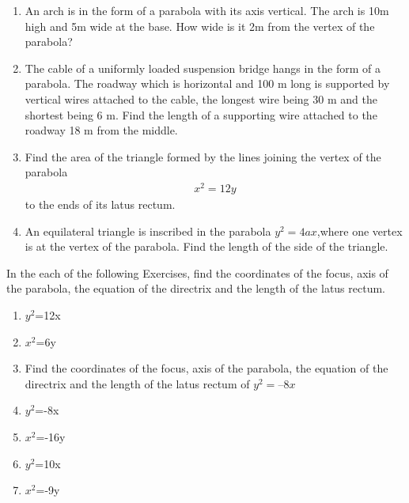 
\begin{enumerate}[label=\thesection.\arabic*,ref=\thesection.\theenumi]
\item An arch is in the form of a parabola with its axis vertical. The arch is 10m high and 5m wide at the base. How wide is it 2m from the vertex of the parabola?
\label{chapters/11/11/5/2}

\item  The cable of a uniformly loaded suspension bridge hangs in the form of a parabola. The roadway which is horizontal and 100 m long is supported by vertical wires attached to the cable, the longest wire being 30 m and the shortest being 6 m. Find the length of a supporting wire attached to the roadway 18 m from the middle.
\label{chapters/11/11/5/3}
\\
\solution

    \item Find the area of the triangle formed by the lines joining the vertex 
    of the parabola 
    \begin{align}
        x^2 = 12y
        \label{eq:chapters/11/11/5/6/parabola}
    \end{align}
    to the ends of its latus rectum.
\label{chapters/11/11/5/6}

\item An equilateral triangle is inscribed in the parabola $y^{2} = 4ax$,where one vertex is at the vertex of the parabola. Find the length of the side of the triangle.
\label{chapters/11/11/5/8}

\end{enumerate}
In the each of the following Exercises, find the coordinates of the focus, axis of the parabola, the equation of the directrix and the length of the latus rectum.
\begin{enumerate}[label=\thesection.\arabic*,ref=\thesection.\theenumi,resume*]

\item $y^2$=12x 
\label{chapters/11/11/2/1}
\\
\solution



\item $x^2$=6y 
\\
\solution

\item Find the coordinates of the focus, axis of the
parabola, the equation of the directrix and the length of the latus rectum of $y^2 = –8x$
\\
\solution

\item $y^2$=-8x

\item $x^2$=-16y
\\
\solution


\item $y^2$=10x  

\item $x^2$=-9y  
\end{enumerate}

